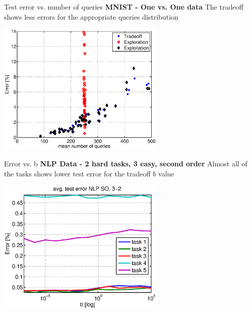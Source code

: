 \documentclass{beamer}
\begin{document}
\begin{frame}{Test error vs. number of queries}
\textbf{MNIST -  One vs. One data} \newline
The tradeoff   shows less errors for the appropriate queries distribution\newline

\begin{centering}
\includegraphics[width=0.6\textwidth]{figs/mnist2b.eps}

\end{centering}

\end{frame}


\begin{frame}{Error vs. b}
\textbf{NLP Data - 2 hard tasks, 3 easy, second order} \newline
Almost all of the tasks shows lower test error for the tradeoff $b$ value  \newline

\begin{centering}
\includegraphics[width=0.6\textwidth]{figs/NLP_SO_3_2_mean_error_tasks.eps}

\end{centering}

\end{frame}
\end{document}
